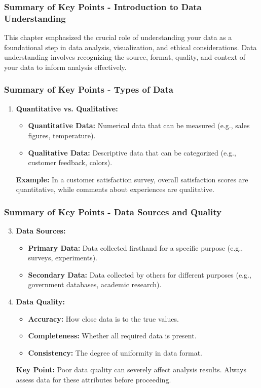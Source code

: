 \documentclass[aspectratio=169]{beamer}
\begin{document}
\begin{frame}[fragile]
    \frametitle{Summary of Key Points - Introduction to Data Understanding}
    This chapter emphasized the crucial role of understanding your data as a foundational step in data analysis, visualization, and ethical considerations. Data understanding involves recognizing the source, format, quality, and context of your data to inform analysis effectively.
\end{frame}

\begin{frame}[fragile]
    \frametitle{Summary of Key Points - Types of Data}
    \begin{enumerate}
        \item \textbf{Quantitative vs. Qualitative:}
            \begin{itemize}
                \item \textbf{Quantitative Data:} Numerical data that can be measured (e.g., sales figures, temperature).
                \item \textbf{Qualitative Data:} Descriptive data that can be categorized (e.g., customer feedback, colors).
            \end{itemize}
            \pause
            \textbf{Example:} In a customer satisfaction survey, overall satisfaction scores are quantitative, while comments about experiences are qualitative.
    \end{enumerate}
\end{frame}

\begin{frame}[fragile]
    \frametitle{Summary of Key Points - Data Sources and Quality}
    \begin{enumerate}
        \setcounter{enumi}{2}  %
        \item \textbf{Data Sources:}
            \begin{itemize}
                \item \textbf{Primary Data:} Data collected firsthand for a specific purpose (e.g., surveys, experiments).
                \item \textbf{Secondary Data:} Data collected by others for different purposes (e.g., government databases, academic research).
            \end{itemize}

        \item \textbf{Data Quality:}
            \begin{itemize}
                \item \textbf{Accuracy:} How close data is to the true values.
                \item \textbf{Completeness:} Whether all required data is present.
                \item \textbf{Consistency:} The degree of uniformity in data format.
            \end{itemize}
            \pause
            \textbf{Key Point:} Poor data quality can severely affect analysis results. Always assess data for these attributes before proceeding.
    \end{enumerate}
\end{frame}
\end{document}
